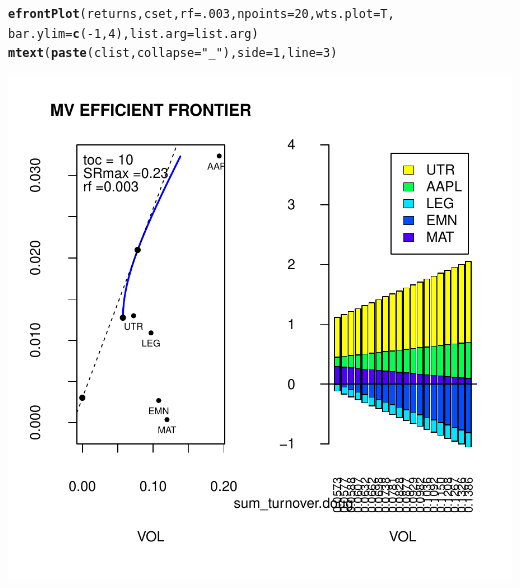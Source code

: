 \documentclass{uwstat518}\usepackage[]{graphicx}\usepackage[]{color}
\makeatletter
\def\maxwidth{ %
  \ifdim\Gin@nat@width>\linewidth
    \linewidth
  \else
    \Gin@nat@width
  \fi
}
\newcommand{\hlstr}[1]{\textcolor[rgb]{0.192,0.494,0.8}{#1}}%
\newcommand{\hlkwd}[1]{\textcolor[rgb]{0.737,0.353,0.396}{\textbf{#1}}}%
\newenvironment{kframe}{%
 \def\at@end@of@kframe{}%
 \ifinner\ifhmode%
  \def\at@end@of@kframe{\end{minipage}}%
  \begin{minipage}{\columnwidth}%
 \fi\fi%
 \def\FrameCommand##1{\hskip\@totalleftmargin \hskip-\fboxsep
 \colorbox{shadecolor}{##1}\hskip-\fboxsep
     \hskip-\linewidth \hskip-\@totalleftmargin \hskip\columnwidth}%
 \MakeFramed {\advance\hsize-\width
   \@totalleftmargin\z@ \linewidth\hsize
   \@setminipage}}%
 {\par\unskip\endMakeFramed%
 \at@end@of@kframe}
\newenvironment{knitrout}{}{} %
\makeatother
\begin{document}
\begin{knitrout}
\begin{kframe}
\begin{alltt}
\hlkwd{efrontPlot}(returns, cset, rf = .003, npoints = 20,wts.plot = T,
		bar.ylim = \hlkwd{c}(-1,4),list.arg=list.arg)
\hlkwd{mtext}(\hlkwd{paste}(clist,collapse=\hlstr{"_"}),side=1,line=3)
\end{alltt}
\end{kframe}
\includegraphics[width=\maxwidth]{figure/unnamed-chunk-72} 

\end{knitrout}
\end{document}
